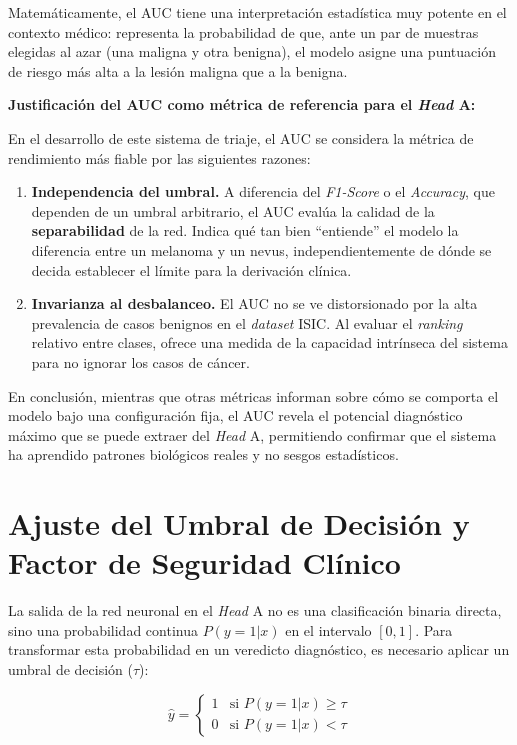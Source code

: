 Matemáticamente, el AUC tiene una interpretación estadística muy potente en el contexto médico: representa la probabilidad de que, ante un par de muestras elegidas al azar (una maligna y otra benigna), el modelo asigne una puntuación de riesgo más alta a la lesión maligna que a la benigna.

\textbf{Justificación del AUC como métrica de referencia para el \textit{Head} A:}

En el desarrollo de este sistema de triaje, el AUC se considera la métrica de rendimiento más fiable por las siguientes razones:

\begin{enumerate}
	\item \textbf{Independencia del umbral.} A diferencia del \textit{F1-Score} o el \textit{Accuracy}, que dependen de un umbral arbitrario, el AUC evalúa la calidad de la \textbf{separabilidad} de la red. Indica qué tan bien ``entiende'' el modelo la diferencia entre un melanoma y un nevus, independientemente de dónde se decida establecer el límite para la derivación clínica.
	
	\item \textbf{Invarianza al desbalanceo.} El AUC no se ve distorsionado por la alta prevalencia de casos benignos en el \textit{dataset} ISIC. Al evaluar el \textit{ranking} relativo entre clases, ofrece una medida de la capacidad intrínseca del sistema para no ignorar los casos de cáncer.
\end{enumerate}

En conclusión, mientras que otras métricas informan sobre cómo se comporta el modelo bajo una configuración fija, el AUC revela el potencial diagnóstico máximo que se puede extraer del \textit{Head} A, permitiendo confirmar que el sistema ha aprendido patrones biológicos reales y no sesgos estadísticos.
\section{Ajuste del Umbral de Decisión y Factor de Seguridad Clínico}

La salida de la red neuronal en el \textit{Head} A no es una clasificación binaria directa, sino una probabilidad continua $P(y=1|x)$ en el intervalo $[0, 1]$. Para transformar esta probabilidad en un veredicto diagnóstico, es necesario aplicar un umbral de decisión ($\tau$):

\begin{equation}
	\hat{y} = 
	\begin{cases} 
		1 & \text{si } P(y=1|x) \geq \tau \\
		0 & \text{si } P(y=1|x) < \tau 
	\end{cases}
\end{equation}

